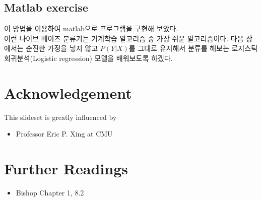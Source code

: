 \documentclass[a4paper]{oblivoir}
\begin{document}
\subsection{Matlab exercise}
\indent 이 방법을 이용하여 matlab으로 프로그램을 구현해 보았다. \\
\indent 이런 나이브 베이즈 분류기는 기계학습 알고리즘 중 가장 쉬운 알고리즘이다. 다음 장에서는 순진한 가정을 넣지 않고 $P(Y|X)$를 그대로 유지해서 분류를 해보는 로지스틱 회귀분석(Logistic regression) 모델을 배워보도록 하겠다. 

\section*{Acknowledgement}
\noindent This slideset is greatly influenced by
\begin{itemize}\setlength\itemsep{-\parsep}
\item Professor Eric P. Xing at CMU
\end{itemize}

\section*{Further Readings}
\begin{itemize}
\setlength\itemsep{-\parsep}
\item Bishop Chapter 1, 8.2
\end{itemize}
\end{document}
